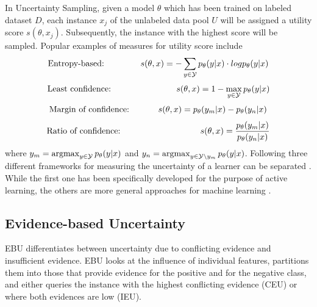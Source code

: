 In Uncertainty Sampling, given a model $\theta$ which has been trained on labeled dataset $D$, each instance $x_j$ of the unlabeled data pool $U$ will be assigned a utility score $s(\theta, x_j)$.
Subsequently, the instance with the highest score will be sampled.
Popular examples of measures for utility score include \cite{human-in-the-loop}
\begin{equation}
    \text{Entropy-based:}\hspace{15mm}
     s(\theta, x) = - \sum_{y \in \mathcal{Y}}{p_{\theta}(y | x) \cdot log p_{\theta}(y|x)}
\end{equation}
\begin{equation}
    \text{Least confidence:}\hspace{27mm}
     s(\theta, x) = 1 - \max_{y \in \mathcal{Y}}{p_{\theta}(y | x)}
\end{equation}
\begin{equation}
    \text{Margin of confidence:}\hspace{12mm}
    s(\theta, x) = p_{\theta}(y_m | x) - p_{\theta}(y_n|x)
\end{equation}
\begin{equation}
    \text{Ratio of confidence:}\hspace{33mm}
    s(\theta, x) = \frac{p_{\theta}(y_m | x)}{p_{\theta}(y_n|x)}
\end{equation}
where
$y_m = \operatorname*{argmax}_{y \in \mathcal{Y}} p_{\theta}(y | x)$ 
and 
$y_n = \operatorname*{argmax}_{y \in \mathcal{Y} \setminus y_m}{p_{\theta}(y | x)}$.
Following three different frameworks for measuring the  uncertainty of a learner can be separated \cite{nguyen2021howtomeasure}.
While the first one has been specifically developed for the purpose of active learning, the others are more general approaches for machine learning \cite{nguyen2021howtomeasure}.

\subsection{Evidence-based Uncertainty} 

\ac{EBU} differentiates between uncertainty due to conflicting evidence and insufficient evidence.
\ac{EBU} looks at the influence of individual features,
partitions them into those that provide evidence for the positive and for the negative class, 
and either queries the instance with the highest conflicting evidence (\ac{CEU}) or where both evidences are low (\ac{IEU}).

